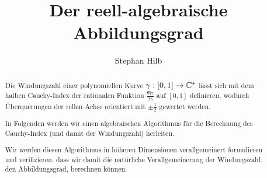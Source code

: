 \documentclass{mythesis}
\title{Der reell-algebraische Abbildungsgrad}
\author{Stephan Hilb}
\begin{document}
\maketitle

\begin{abstract}
    Die Windungszahl einer polynomiellen Kurve $\gamma: [0, 1] \to \mathbb { C }^*$ lässt sich mit dem halben Cauchy-Index der rationalen Funktion $\frac{\Re \gamma}{\Im \gamma}$ auf $[0,1]$ definieren, wodurch Überquerungen der rellen Achse orientiert mit $\pm \frac{1}{2}$ gewertet werden.

    In Folgenden werden wir einen algebraischen Algorithmus für die Berechnung des Cauchy-Index (und damit der Windungszahl) herleiten.

    Wir werden diesen Algorithmus in höheren Dimensionen verallgemeinert formulieren und verifizieren, dass wir damit die natürliche Verallgemeinerung der Windungszahl, den Abbildungsgrad, berechnen können.
\end{abstract}
\end{document}
